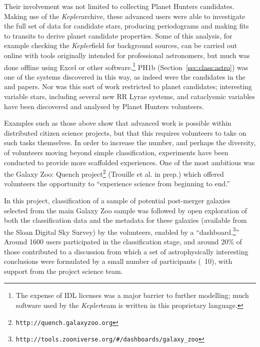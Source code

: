 \documentclass{ar2e}
\def\Sref#1{Section~\ref{#1}\xspace}
\def\CaseStudy#1{\noindent{\it\bf #1 \,\,\,\,}}
\def\url#1{\texttt{#1}}
\def\Kepler{{\it Kepler}}
\begin{document}
Their involvement was not limited to collecting Planet Hunters candidates.
Making use of the \Kepler archive, these advanced users were able to investigate
the full set of data for candidate stars, producing periodograms and making
fits  to transits to derive planet candidate properties. Some of this analysis,
for example checking the \Kepler field for  background sources, can be carried
out online with tools originally intended for professional astronomers, but much
was done offline using Excel or other software.\footnote{The expense of IDL
licenses was a major barrier to further modelling; much  software used by the
\Kepler team is written in this proprietary language.} 
PH1b (\Sref{sec:class:astro}) was one of the systems discovered in this way, as indeed 
were the candidates in the \citet{Wang2013} and \citet{Schmitt2014} papers.
Nor was this sort of work
restricted to planet candidates; interesting variable stars, including several
new RR Lyrae systems, and cataclysmic variables \citep[e.g.\ ][]{KatoOsaki} 
have been discovered and analysed by Planet Hunters volunteers. 




\CaseStudy{Galaxy Zoo: Quench.} 
Examples such as those above show that advanced work is possible within
distributed citizen science projects, but that this requires volunteers to take
on such tasks themselves. In order to increase the number, and perhaps the
diversity, of volunteers moving beyond simple classification, experiments have
been conducted to provide more scaffolded experiences. One of the most ambitious
was the Galaxy Zoo: Quench project\footnote{\url{http://quench.galaxyzoo.org}}
(Trouille et al. in prep.) which offered volunteers the opportunity to
``experience science from beginning to end.''

In this project, classification of a sample of potential post-merger galaxies
selected from the main Galaxy Zoo sample was followed by open exploration of
both the classification data and the metadata for these galaxies (available from
the Sloan Digital Sky Survey) by the volunteers, enabled by a
``dashboard.\footnote{\url{http://tools.zooniverse.org/\#/dashboards/galaxy\_zoo}}''
Around 1600 users participated in the classification stage, and  around 20\% of
those contributed to a discussion from which a set of astrophysically
interesting conclusions were formulated by a small number of participants (~10),
with support from the project science team.
\end{document}
